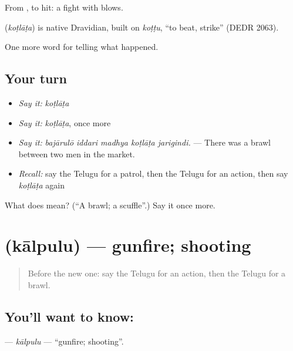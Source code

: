From , to hit: a fight with blows.

\begin{cousinweb}
\textbf{} (\emph{koṭlāṭa}) is native Dravidian, built on \emph{koṭṭu}, \textquotedblleft{}to beat, strike\textquotedblright{} (DEDR 2063).
\end{cousinweb}

\begin{grammarlens}[title={What you've built}]
One more word for telling what happened.
\end{grammarlens}

\subsection*{Your turn}
\begin{itemize}
\raggedright
  \item \emph{Say it:} \emph{koṭlāṭa}
  \item \emph{Say it:} \emph{koṭlāṭa}, once more
  \item \emph{Say it:} \emph{bajārulō iddari madhya koṭlāṭa jarigindi.} — There was a brawl between two men in the market.
  \item \emph{Recall:} say the Telugu for a patrol, then the Telugu for an action, then say \emph{koṭlāṭa} again
\end{itemize}

\begin{tcolorbox}[breakable,colback=teal!4,colframe=teal!35!black,title={Before you move on}]
What does  mean? (\textquotedblleft{}A brawl; a scuffle\textquotedblright{}.) Say it once more.
\end{tcolorbox}
\section[\texorpdfstring{\te{కాల్పులు} (kālpulu)}{కాల్పులు (kālpulu)}]{ (kālpulu) — gunfire; shooting}

\label{lesson:TE-C378-kalpulu}



\begin{quote}
Before the new one: say the Telugu for an action, then the Telugu for a brawl.
\end{quote}

\subsection*{You'll want to know: }
\textbf{} — \emph{kālpulu} — \textquotedblleft{}gunfire; shooting\textquotedblright{}.

